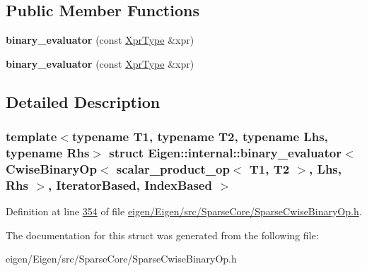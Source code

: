 \subsection*{Public Member Functions}
\begin{DoxyCompactItemize}
\item 
\mbox{\label{struct_eigen_1_1internal_1_1binary__evaluator_3_01_cwise_binary_op_3_01scalar__product__op_3_01_f2d05246f46046f640624904370b9473_aab8abc31d595ff831492f2fe97c8038d}} 
{\bfseries binary\+\_\+evaluator} (const \hyperlink{group___core___module_class_eigen_1_1_cwise_binary_op}{Xpr\+Type} \&xpr)
\item 
\mbox{\label{struct_eigen_1_1internal_1_1binary__evaluator_3_01_cwise_binary_op_3_01scalar__product__op_3_01_f2d05246f46046f640624904370b9473_aab8abc31d595ff831492f2fe97c8038d}} 
{\bfseries binary\+\_\+evaluator} (const \hyperlink{group___core___module_class_eigen_1_1_cwise_binary_op}{Xpr\+Type} \&xpr)
\end{DoxyCompactItemize}


\subsection{Detailed Description}
\subsubsection*{template$<$typename T1, typename T2, typename Lhs, typename Rhs$>$\newline
struct Eigen\+::internal\+::binary\+\_\+evaluator$<$ Cwise\+Binary\+Op$<$ scalar\+\_\+product\+\_\+op$<$ T1, T2 $>$, Lhs, Rhs $>$, Iterator\+Based, Index\+Based $>$}



Definition at line \hyperlink{eigen_2_eigen_2src_2_sparse_core_2_sparse_cwise_binary_op_8h_source_l00354}{354} of file \hyperlink{eigen_2_eigen_2src_2_sparse_core_2_sparse_cwise_binary_op_8h_source}{eigen/\+Eigen/src/\+Sparse\+Core/\+Sparse\+Cwise\+Binary\+Op.\+h}.



The documentation for this struct was generated from the following file\+:\begin{DoxyCompactItemize}
\item 
eigen/\+Eigen/src/\+Sparse\+Core/\+Sparse\+Cwise\+Binary\+Op.\+h\end{DoxyCompactItemize}
